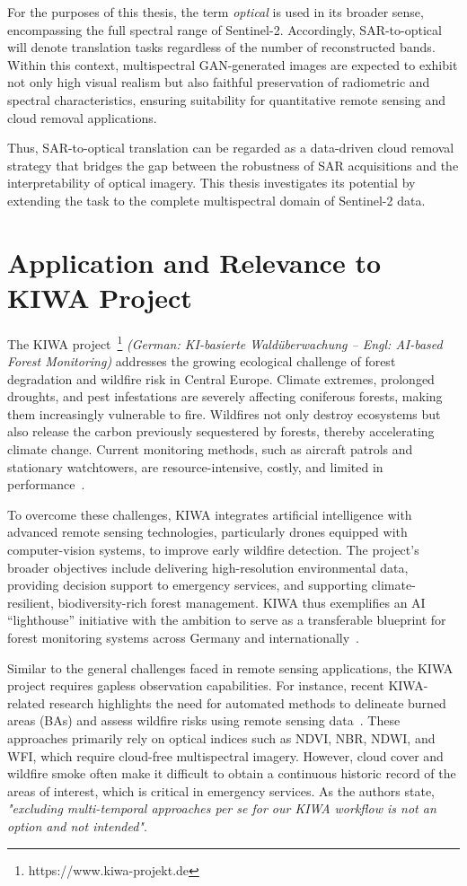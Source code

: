 For the purposes of this thesis, the term \emph{optical} is used in its broader sense, encompassing the full spectral range of Sentinel-2. Accordingly, SAR-to-optical will denote translation tasks regardless of the number of reconstructed bands. Within this context, multispectral GAN-generated images are expected to exhibit not only high visual realism but also faithful preservation of radiometric and spectral characteristics, ensuring suitability for quantitative remote sensing and cloud removal applications.

Thus, SAR-to-optical translation can be regarded as a data-driven cloud removal strategy that bridges the gap between the robustness of SAR acquisitions and the interpretability of optical imagery. This thesis investigates its potential by extending the task to the complete multispectral domain of Sentinel-2 data.

\section{Application and Relevance to KIWA Project}
The KIWA project~\footnote{https://www.kiwa-projekt.de} \textit{(German: KI-basierte Waldüberwachung – Engl: AI-based Forest Monitoring)} addresses the growing ecological challenge of forest degradation and wildfire risk in Central Europe. Climate extremes, prolonged droughts, and pest infestations are severely affecting coniferous forests, making them increasingly vulnerable to fire. Wildfires not only destroy ecosystems but also release the carbon previously sequestered by forests, thereby accelerating climate change. Current monitoring methods, such as aircraft patrols and stationary watchtowers, are resource-intensive, costly, and limited in performance~\cite{THD_ZAF}.

To overcome these challenges, KIWA integrates artificial intelligence with advanced remote sensing technologies, particularly drones equipped with computer-vision systems, to improve early wildfire detection. The project’s broader objectives include delivering high-resolution environmental data, providing decision support to emergency services, and supporting climate-resilient, biodiversity-rich forest management. KIWA thus exemplifies an AI “lighthouse” initiative with the ambition to serve as a transferable blueprint for forest monitoring systems across Germany and internationally~\cite{KIWA_Project}.

Similar to the general challenges faced in remote sensing applications, the KIWA project requires gapless observation capabilities. For instance, recent KIWA-related research highlights the need for automated methods to delineate burned areas (BAs) and assess wildfire risks using remote sensing data~\cite{kiwa_auto_Delineation_BAs}. These approaches primarily rely on optical indices such as NDVI, NBR, NDWI, and WFI, which require cloud-free multispectral imagery. However, cloud cover and wildfire smoke often make it difficult to obtain a continuous historic record of the areas of interest, which is critical in emergency services. As the authors state, \textit{"excluding multi-temporal approaches per se for our KIWA workflow is not an option and not intended"}.

